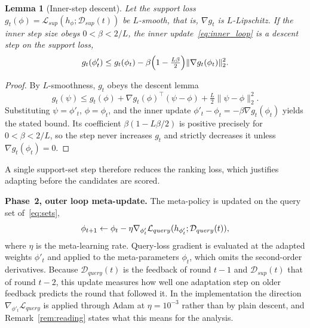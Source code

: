 \documentclass[journal]{IEEEtran}
\newtheorem{Lemma}{Lemma}
\theoremstyle{remark}
\newcommand{\revision}[1]{#1}
\newcommand{\revtwo}[1]{#1}
\begin{document}
{\color{black}
\begin{Lemma}[Inner-step descent]\label{stmt:inner}
Let the support loss $g_t(\phi)=\mathcal{L}_{sup}(h_\phi;\mathcal{D}_{sup}(t))$ be $L$-smooth, that is, $\nabla g_t$ is $L$-Lipschitz. If the inner step size obeys $0<\beta<2/L$, the inner update~\eqref{eq:inner_loop} is a descent step on the support loss,
\[
g_t(\phi'_t)\le g_t(\phi_t)-\beta\Bigl(1-\tfrac{L\beta}{2}\Bigr)\lVert\nabla g_t(\phi_t)\rVert_2^2 .
\]
\end{Lemma}
\begin{proof}
By $L$-smoothness, $g_t$ obeys the descent lemma
\[
g_t(\psi)\le g_t(\phi)+\nabla g_t(\phi)^{\top}(\psi-\phi)+\tfrac{L}{2}\lVert\psi-\phi\rVert_2^2 .
\]
Substituting $\psi=\phi'_t$, $\phi=\phi_t$, and the inner update $\phi'_t-\phi_t=-\beta\nabla g_t(\phi_t)$ yields the stated bound. Its coefficient $\beta(1-L\beta/2)$ is positive precisely for $0<\beta<2/L$, so the step never increases $g_t$ and strictly decreases it unless $\nabla g_t(\phi_t)=0$.
\end{proof}
A single support-set step therefore reduces the ranking loss, which justifies adapting before the candidates are scored.
}

\textbf{Phase~2\revtwo{, outer loop meta-update}.}
\revision{%
The meta-policy is updated on \revtwo{the query set of~\eqref{eq:sets}},}
\begin{equation}
		\color{black}
		\phi_{t+1} \leftarrow \phi_t - \eta \nabla_{\phi'_t} \mathcal{L}_{query}(h_{\phi'_t}; \mathcal{D}_{query}(t)),
		\label{eq:outer_loop}
\end{equation}
\revision{where $\eta$ is the meta-learning rate. %
Query-loss gradient is evaluated at the adapted weights $\phi'_t$ and applied to the meta-parameters $\phi_t$, which omits the second-order derivatives.} \revtwo{Because $\mathcal{D}_{query}(t)$ is the feedback of round $t-1$ and $\mathcal{D}_{sup}(t)$ that of round $t-2$, this update measures how well one adaptation step on older feedback predicts the round that followed it. In the implementation the direction $\nabla_{\phi'_t}\mathcal{L}_{query}$ is applied through Adam at $\eta=10^{-3}$ rather than by plain descent, and Remark~\ref{rem:reading} states what this means for the analysis.}
\end{document}
